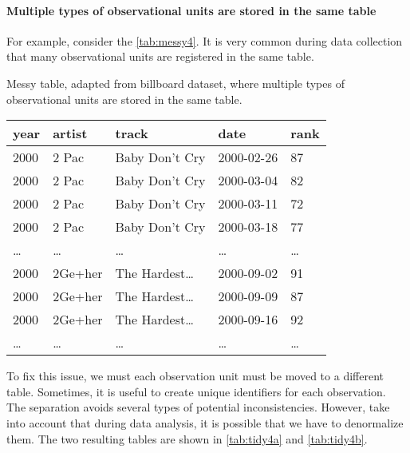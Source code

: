
\paragraph{Multiple types of observational units are stored in the same table}  For
example, consider the \cref{tab:messy4}.  It is very common during data collection that
many observational units are registered in the same table.

\begin{tablebox}[label=tab:messy4]{Messy table, adapted from billboard dataset, where multiple types of observational units are stored in the same table.}
  \centering
  \begin{tabular}{lllll}
    \toprule
    year & artist & track & date & rank \\
    \midrule
    2000 & 2 Pac & Baby Don't Cry & 2000-02-26 & 87 \\
    2000 & 2 Pac & Baby Don't Cry & 2000-03-04 & 82 \\
    2000 & 2 Pac & Baby Don't Cry & 2000-03-11 & 72 \\
    2000 & 2 Pac & Baby Don't Cry & 2000-03-18 & 77 \\
    \dots & \dots & \dots & \dots & \dots \\
    2000 & 2Ge+her & The Hardest\dots & 2000-09-02 & 91 \\
    2000 & 2Ge+her & The Hardest\dots & 2000-09-09 & 87 \\
    2000 & 2Ge+her & The Hardest\dots & 2000-09-16 & 92 \\
    \dots & \dots & \dots & \dots & \dots \\
    \bottomrule
  \end{tabular}
\end{tablebox}

To fix this issue, we must each observation unit must be moved to a different table.
Sometimes, it is useful to create unique identifiers for each observation.
The separation avoids several types of potential inconsistencies.  However, take into
account that during data analysis, it is possible that we have to denormalize them.  The
two resulting tables are shown in \cref{tab:tidy4a} and \cref{tab:tidy4b}.

